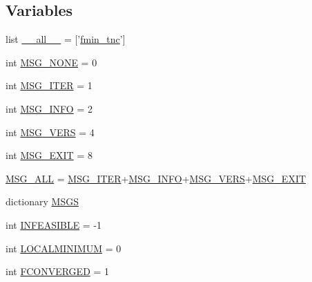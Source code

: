 \subsection*{Variables}
\begin{DoxyCompactItemize}
\item 
list \hyperlink{namespacescipy_1_1optimize_1_1tnc_ae1d6c7e153291cf8aa40f0e4f6139841}{\+\_\+\+\_\+all\+\_\+\+\_\+} = \mbox{[}'\hyperlink{namespacescipy_1_1optimize_1_1tnc_a7f2939e18b1a7cbba18fb501a3dda100}{fmin\+\_\+tnc}'\mbox{]}
\item 
int \hyperlink{namespacescipy_1_1optimize_1_1tnc_ab2e75c0c1f1fdb2509c68ad3b4a81ab9}{M\+S\+G\+\_\+\+N\+O\+N\+E} = 0
\item 
int \hyperlink{namespacescipy_1_1optimize_1_1tnc_a756fd1bf6d3b4403d69e8f02281c5ade}{M\+S\+G\+\_\+\+I\+T\+E\+R} = 1
\item 
int \hyperlink{namespacescipy_1_1optimize_1_1tnc_a91b99c9322e3a35595bfd2ab50c1b48c}{M\+S\+G\+\_\+\+I\+N\+F\+O} = 2
\item 
int \hyperlink{namespacescipy_1_1optimize_1_1tnc_aa7f5bc1e2cf027aa4490dd2ad8412860}{M\+S\+G\+\_\+\+V\+E\+R\+S} = 4
\item 
int \hyperlink{namespacescipy_1_1optimize_1_1tnc_a68ebce30e25f8c950bd0e128fb76072c}{M\+S\+G\+\_\+\+E\+X\+I\+T} = 8
\item 
\hyperlink{namespacescipy_1_1optimize_1_1tnc_acb8bf96b302ab43dc50fbea6a981dec2}{M\+S\+G\+\_\+\+A\+L\+L} = \hyperlink{namespacescipy_1_1optimize_1_1tnc_a756fd1bf6d3b4403d69e8f02281c5ade}{M\+S\+G\+\_\+\+I\+T\+E\+R}+\hyperlink{namespacescipy_1_1optimize_1_1tnc_a91b99c9322e3a35595bfd2ab50c1b48c}{M\+S\+G\+\_\+\+I\+N\+F\+O}+\hyperlink{namespacescipy_1_1optimize_1_1tnc_aa7f5bc1e2cf027aa4490dd2ad8412860}{M\+S\+G\+\_\+\+V\+E\+R\+S}+\hyperlink{namespacescipy_1_1optimize_1_1tnc_a68ebce30e25f8c950bd0e128fb76072c}{M\+S\+G\+\_\+\+E\+X\+I\+T}
\item 
dictionary \hyperlink{namespacescipy_1_1optimize_1_1tnc_a6e98b71175e3f3381bd5a1d3b2592472}{M\+S\+G\+S}
\item 
int \hyperlink{namespacescipy_1_1optimize_1_1tnc_a76979298fe7b1ea43b1bfd8441985a8f}{I\+N\+F\+E\+A\+S\+I\+B\+L\+E} = -\/1
\item 
int \hyperlink{namespacescipy_1_1optimize_1_1tnc_a3404ab9cd88ac67192da51525d641f29}{L\+O\+C\+A\+L\+M\+I\+N\+I\+M\+U\+M} = 0
\item 
int \hyperlink{namespacescipy_1_1optimize_1_1tnc_a24b4b93ac05a19e8efb1954bbccf13db}{F\+C\+O\+N\+V\+E\+R\+G\+E\+D} = 1
\item 

\end{DoxyCompactItemize}
